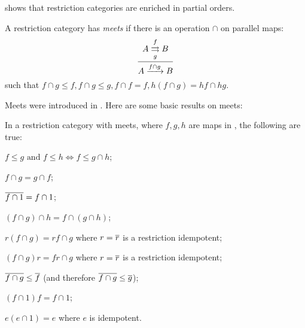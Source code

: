 shows that restriction categories are enriched in
partial orders.

\begin{definition}
A restriction category has \emph{meets} if there is an operation
$\cap$ on parallel maps:
\[
\infer{A\xrightarrow{f\cap g} B}
  {A\overset{f}{\underset{g}{\rightrightarrows}}B}
\]
such that $f\cap g \le f, f\cap g \le g, f\cap f = f,
h (f\cap g) = h f \cap hg$.
\end{definition}

Meets were introduced in \cite{cockett-guo-hofstra-2012:range2}.
Here are some  basic results on meets:

\begin{lemma}\label{lem:properties_of_meets_in_restriction_categories}
In a restriction category \X with meets, where $f, g, h$ are maps in
\X, the following are true:
\bproofenum
\item $f\le g \text{ and } f \le h \iff f \le g\cap h$; \label{lemsub:properties_of_meets_one}
\item $f\cap g = g \cap f$;\label{lemsub:properties_of_meets_two}
\item $\overline{f\cap 1} = f \cap 1$;\label{lemsub:properties_of_meets_three}
\item $(f \cap g) \cap h = f \cap (g \cap h)$;
\item $r(f\cap g) = r f \cap g$ where $r=\overline{r}$ is a restriction idempotent;
\item $(f\cap g)r = f r \cap g$ where $r=\overline{r}$ is a restriction idempotent;
\item $\overline{f\cap g} \le \overline{f}$ (and therefore $\overline{f\cap g} \le \overline{g}$);
\item $ (f \cap 1) f = f \cap 1$;
\item $ e(e \cap 1) = e$ where $e$ is idempotent.
\eproofenum
\end{lemma}
